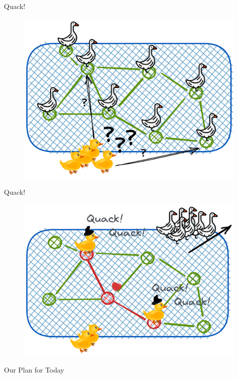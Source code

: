 
\begin{frame}[c]{Quack!}
\begin{figure}[t]
    \centering
    \includegraphics[width=0.9\columnwidth]{../thesis/fig/excalidraw/lake-left.png}
\end{figure}
\end{frame}


\begin{frame}[c]{Quack!}
\begin{figure}[t]
    \centering
    \includegraphics[width=0.9\columnwidth]{../thesis/fig/excalidraw/lake-right.png}
\end{figure}
\end{frame}


\begin{frame}{Our Plan for Today}
    \tableofcontents
\end{frame}